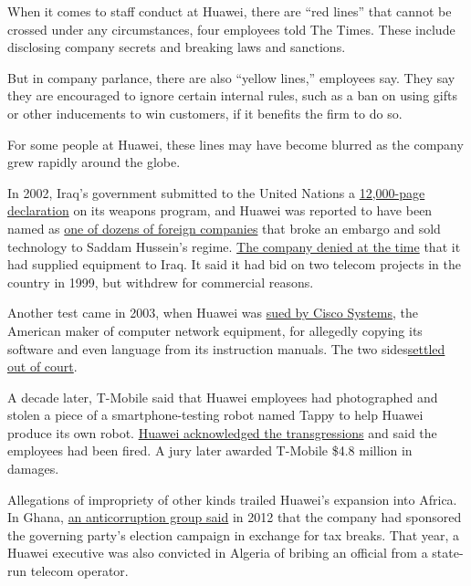 When it comes to staff conduct at Huawei, there are ``red lines'' that
cannot be crossed under any circumstances, four employees told The
Times. These include disclosing company secrets and breaking laws and
sanctions.

But in company parlance, there are also ``yellow lines,'' employees say.
They say they are encouraged to ignore certain internal rules, such as a
ban on using gifts or other inducements to win customers, if it benefits
the firm to do so.

For some people at Huawei, these lines may have become blurred as the
company grew rapidly around the globe.

In 2002, Iraq's government submitted to the United Nations a
\href{https://www.nytimes.com/2002/12/08/world/threats-responses-arms-inspections-iraq-says-report-un-shows-no-banned-arms.html}{12,000-page
declaration} on its weapons program, and Huawei was reported to have
been named as \href{http://news.bbc.co.uk/2/hi/europe/2591351.stm}{one
of dozens of foreign companies} that broke an embargo and sold
technology to Saddam Hussein's regime.
\href{https://www.scmp.com/article/410267/huawei-broke-iraq-embargo}{The
company denied at the time} that it had supplied equipment to Iraq. It
said it had bid on two telecom projects in the country in 1999, but
withdrew for commercial reasons.

Another test came in 2003, when Huawei was
\href{https://www.nytimes.com/2003/01/24/business/technology-cisco-is-suing-a-competitor-based-in-china.html}{sued
by Cisco Systems}, the American maker of computer network equipment, for
allegedly copying its software and even language from its instruction
manuals. The two
sides\href{https://www.nytimes.com/2003/10/02/business/technology-cisco-agrees-to-suspend-patent-suit-for-6-months.html}{settled
out of court}.

A decade later, T-Mobile said that Huawei employees had photographed and
stolen a piece of a smartphone-testing robot named Tappy to help Huawei
produce its own robot.
\href{https://www.nytimes.com/2014/09/06/business/t-mobile-accuses-huawei-of-theft-from-laboratory.html}{Huawei
acknowledged the transgressions} and said the employees had been fired.
A jury later awarded T-Mobile \$4.8 million in damages.

Allegations of impropriety of other kinds trailed Huawei's expansion
into Africa. In Ghana,
\href{https://www.ghanaweb.com/GhanaHomePage/NewsArchive/AFAG-Exposes-NDC-Huawei-Corrupt-Deals-253492}{an
anticorruption group said} in 2012 that the company had sponsored the
governing party's election campaign in exchange for tax breaks. That
year, a Huawei executive was also convicted in Algeria of bribing an
official from a state-run telecom operator.

